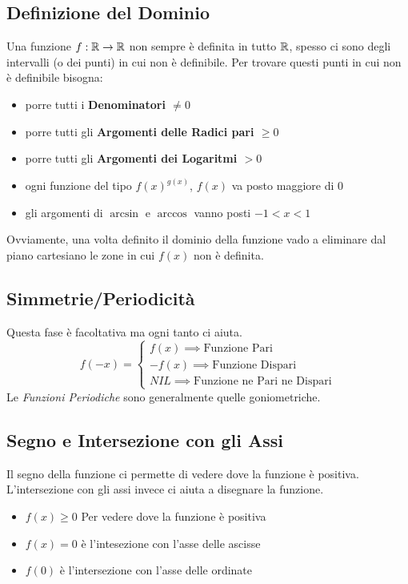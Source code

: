 \documentclass[12pt, a4paper, openany]{book}
\begin{document}
\subsection*{Definizione del Dominio}
Una funzione $f:\mathbb{R} \to \mathbb{R}$ non sempre è definita in tutto $\mathbb{R}$, spesso ci sono degli intervalli (o dei punti) in cui non è definibile.
Per trovare questi punti in cui non è definibile bisogna:
\begin{itemize}
	\item porre tutti i \textbf{Denominatori $\neq 0$}
 \item porre tutti gli \textbf{Argomenti delle Radici pari $\geq 0$}
 \item porre tutti gli \textbf{Argomenti dei Logaritmi $>0$}
 \item ogni funzione del tipo $f(x)^{g(x)}$, $f(x)$ va posto maggiore di 0
 \item gli argomenti di $\arcsin$ e $\arccos$ vanno posti $-1 < x <1$
\end{itemize}
Ovviamente, una volta definito il dominio della funzione vado a eliminare dal piano cartesiano le zone in cui $f(x)$ non è definita.
\subsection*{Simmetrie/Periodicità}
Questa fase è facoltativa ma ogni tanto ci aiuta.
\begin{equation}
	f(-x) = \begin{cases}
		f(x) \implies \text{Funzione Pari}\\
		-f(x) \implies \text{Funzione Dispari}\\
		NIL \implies \text{Funzione ne Pari ne Dispari}
	\end{cases}
\end{equation}
Le \emph{Funzioni Periodiche} sono generalmente quelle goniometriche.

\subsection*{Segno e Intersezione con gli Assi}
Il segno della funzione ci permette di vedere dove la funzione è positiva.
L'intersezione con gli assi invece ci aiuta a disegnare la funzione.
\begin{itemize}
	\item $f(x)\geq 0$ Per vedere dove la funzione è positiva
 \item $f(x)=0$ è l'intesezione con l'asse delle ascisse
 \item $f(0)$ è l'intersezione con l'asse delle ordinate
\end{itemize}
\end{document}
